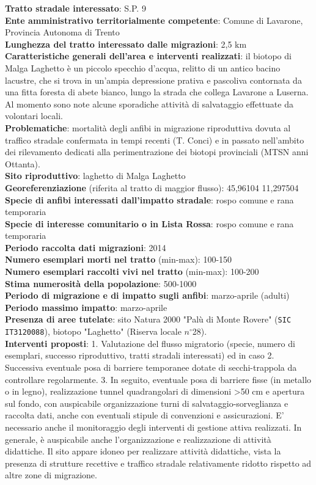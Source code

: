 \documentclass[11pt,a4paper,twoside]{memoir}
\begin{document}
\textbf{Tratto stradale interessato}: S.P. 9 \\
\textbf{Ente amministrativo territorialmente competente}: Comune di Lavarone, Provincia Autonoma di Trento  \\
\textbf{Lunghezza del tratto interessato dalle migrazioni}: 2,5 km \\
\textbf{Caratteristiche generali dell’area e interventi realizzati}: il biotopo di Malga Laghetto è un piccolo specchio d'acqua, relitto di un antico bacino lacustre, che si trova in un'ampia depressione prativa e pascoliva contornata da una fitta foresta di abete bianco, lungo la strada che collega Lavarone a Luserna. Al momento sono note alcune sporadiche attività di salvataggio effettuate da volontari locali. \\
\textbf{Problematiche}: mortalità degli anfibi in migrazione riproduttiva dovuta al traffico stradale confermata in tempi recenti (T. Conci) e in passato nell’ambito dei rilevamento dedicati alla perimentrazione dei biotopi provinciali (MTSN anni Ottanta). \\
\textbf{Sito riproduttivo}: laghetto di Malga Laghetto \\
\textbf{Georeferenziazione} (riferita al tratto di maggior flusso): 45,96104 11,297504 \\
\textbf{Specie di anfibi interessati dall’impatto stradale}: rospo comune e rana temporaria \\
\textbf{Specie di interesse comunitario o in Lista Rossa}: rospo comune e rana temporaria \\
\textbf{Periodo raccolta dati migrazioni}: 2014 \\
\textbf{Numero esemplari morti nel tratto} (min-max): 100-150 \\
\textbf{Numero esemplari raccolti vivi nel tratto} (min-max): 100-200 \\
\textbf{Stima numerosità della popolazione}: 500-1000 \\
\textbf{Periodo di migrazione e di impatto sugli anfibi}: marzo-aprile (adulti) \\
\textbf{Periodo massimo impatto}: marzo-aprile \\
\textbf{Presenza di aree tutelate}: sito Natura 2000 "Palù di Monte Rovere" (\texttt{SIC IT3120088}), biotopo "Laghetto" (Riserva locale $n^{\circ}$28). \\
\textbf{Interventi proposti}: 1. Valutazione del flusso migratorio (specie, numero di esemplari, successo riproduttivo, tratti stradali interessati) ed in caso 2. Successiva eventuale posa di barriere temporanee dotate di secchi-trappola da controllare regolarmente. 3. In seguito, eventuale posa di barriere fisse (in metallo o in legno), realizzazione tunnel quadrangolari di dimensioni >50 cm e apertura sul fondo, con auspicabile organizzazione turni di salvataggio-sorveglianza e raccolta dati, anche con eventuali stipule di convenzioni e assicurazioni. E' necessario anche il monitoraggio degli interventi di gestione attiva realizzati. In generale, è auspicabile anche l'organizzazione e realizzazione di attività didattiche. Il sito appare idoneo per realizzare attività didattiche, vista la presenza di strutture recettive e traffico stradale relativamente ridotto rispetto ad altre zone di migrazione. \\
\end{document}
